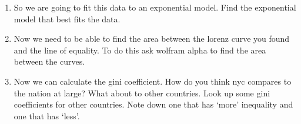 \documentclass[12pt]{article}
\theoremstyle{plain}     %
\begin{document}
\begin{enumerate}
\begin{enumerate}
			\item So we are going to fit this data to an exponential model. Find the exponential model that best fits the data.
			\item Now we need to be able to find the area between the lorenz curve you found and the line of equality. To do this ask wolfram alpha to find the area between the curves.
			\item Now we can calculate the gini coefficient. How do you think nyc compares to the nation at large? What about to other countries. Look up some gini coefficients for other countries. Note down one that has `more' inequality and one that has `less'.
			\end{enumerate}
\end{enumerate}
	
\end{document}
